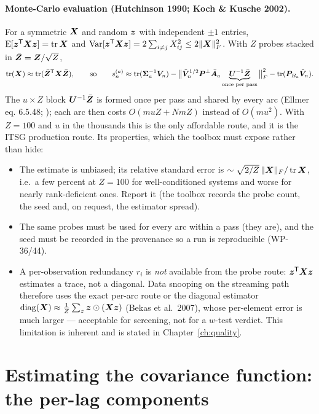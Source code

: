 \paragraph{Monte-Carlo evaluation (Hutchinson 1990; Koch \& Kusche 2002).} For a symmetric $\bm{X}$ and random $\bm{z}$ with independent $\pm1$ entries, $\operatorname{E}[\bm{z}^{\mathsf T}\bm{X}\bm{z}] = \operatorname{tr}\bm{X}$ and $\operatorname{Var}[\bm{z}^{\mathsf T}\bm{X}\bm{z}] = 2\sum_{i\ne j}X_{ij}^2 \le 2\|\bm{X}\|_F^2$. With $Z$ probes stacked in $\bar{\bm{Z}} = \bm{Z}/\sqrt Z$,
\begin{equation}
\operatorname{tr}(\bm{X}) \approx \operatorname{tr}(\bar{\bm{Z}}^{\mathsf T}\bm{X}\bar{\bm{Z}}), \qquad
\text{so}\qquad s_n^{(a)} \approx \operatorname{tr}(\bm{\Sigma}_a^{-1}\bm{V}_n) - \big\|\tilde{\bm{V}}_n^{1/2}\bm{P}^\perp\bar{\bm{A}}_a\underbrace{\bm{U}^{-1}\bar{\bm{Z}}}_{\text{once per pass}}\big\|_F^2 - \operatorname{tr}(\bm{P}_{B_a}\tilde{\bm{V}}_n).
\label{eq:hutch}
\end{equation}
The $u\times Z$ block $\bm{U}^{-1}\bar{\bm{Z}}$ is formed once per pass and shared by every arc (Ellmer eq. 6.5.48; ); each arc then costs $O(m u Z + N m Z)$ instead of $O(m u^2)$. With $Z = 100$ and $u$ in the thousands this is the only affordable route, and it is the ITSG production route. Its properties, which the toolbox must expose rather than hide:
\begin{itemize}
\item The estimate is unbiased; its relative standard error is $\sim\sqrt{2/Z}\,\|\bm{X}\|_F/\operatorname{tr}\bm{X}$, i.e.\ a few percent at $Z=100$ for well-conditioned systems and worse for nearly rank-deficient ones. Report it (the toolbox records the probe count, the seed and, on request, the estimator spread).
\item The same probes must be used for every arc within a pass (they are), and the seed must be recorded in the provenance so a run is reproducible (WP-36/44).
\item A per-observation redundancy $r_i$ is \emph{not} available from the probe route: $\bm{z}^{\mathsf T}\bm{X}\bm{z}$ estimates a trace, not a diagonal. Data snooping on the streaming path therefore uses the exact per-arc route or the diagonal estimator $\operatorname{diag}(\bm{X})\approx \frac1Z\sum_z \bm{z}\odot(\bm{X}\bm{z})$ (Bekas et al.\ 2007), whose per-element error is much larger --- acceptable for screening, not for a $w$-test verdict. This limitation is inherent and is stated in Chapter~\ref{ch:quality}.
\end{itemize}

\section{Estimating the covariance function: the per-lag components}
\label{sec:perlag}

